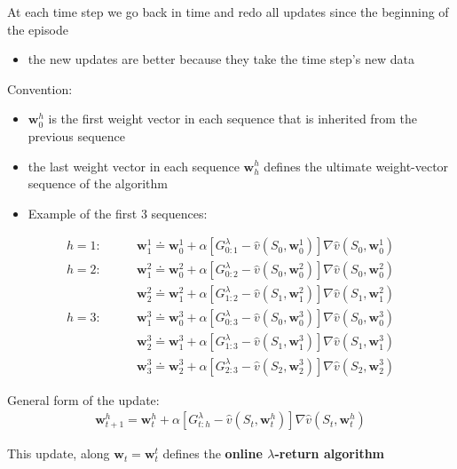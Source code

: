 \documentclass[sutton_barto_notes.tex]{subfiles}
\begin{document}
 At each time step we go back in time and redo all updates since the beginning of the episode 
\begin{itemize}
\item the new updates are better because they take the time step’s new data 
\end{itemize}

 Convention: 
\begin{itemize}
\item $\mathbf{w}_0^h$ is the first weight vector in each sequence that is inherited from the previous sequence 
\item the last weight vector in each sequence $\mathbf{w}_h^h$ defines the ultimate weight-vector sequence of the algorithm 
\item Example of the first 3 sequences: 
\end{itemize}
\begin{align*}
h = 1: \quad \quad & \mathbf{w}_1^1 \doteq \mathbf{w}_0^1 + \alpha [G_{0:1}^{\lambda} - \hat{v}(S_0, \mathbf{w}_0^1)] \nabla \hat{v}(S_0, \mathbf{w}_0^1)
\end{align*} 
\begin{align*}
h = 2: \quad \quad & \mathbf{w}_1^2 \doteq \mathbf{w}_0^2 + \alpha [G_{0:2}^{\lambda} - \hat{v}(S_0, \mathbf{w}_0^2)] \nabla \hat{v}(S_0, \mathbf{w}_0^2)\\
 & \mathbf{w}_2^2 \doteq \mathbf{w}_1^2 + \alpha [G_{1:2}^{\lambda} - \hat{v}(S_1, \mathbf{w}_1^2)] \nabla \hat{v}(S_1, \mathbf{w}_1^2)
\end{align*} 
\begin{align*}
h = 3: \quad \quad & \mathbf{w}_1^3 \doteq \mathbf{w}_0^3 + \alpha [G_{0:3}^{\lambda} - \hat{v}(S_0, \mathbf{w}_0^3)] \nabla \hat{v}(S_0, \mathbf{w}_0^3)\\
 & \mathbf{w}_2^3 \doteq \mathbf{w}_1^3 + \alpha [G_{1:3}^{\lambda} - \hat{v}(S_1, \mathbf{w}_1^3)] \nabla \hat{v}(S_1, \mathbf{w}_1^3)\\
 & \mathbf{w}_3^3 \doteq \mathbf{w}_2^3 + \alpha [G_{2:3}^{\lambda} - \hat{v}(S_2, \mathbf{w}_2^3)] \nabla \hat{v}(S_2, \mathbf{w}_2^3)
\end{align*} 

 General form of the update:
\begin{align}\mathbf{w}_{t+1}^h = \mathbf{w}_t^h + \alpha [G_{t:h}^{\lambda} - \hat{v}(S_t, \mathbf{w}_t^h)] \nabla \hat{v}(S_t, \mathbf{w}_t^h) \label{eq:12.9}\tag{12.9}\end{align}

 This update, along $\mathbf{w}_t = \mathbf{w}_t^t$ defines the \textbf{online $\lambda$-return algorithm} 
\end{document}
